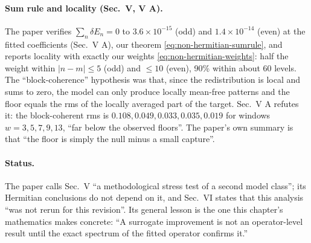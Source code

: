 \paragraph{Sum rule and locality (Sec.~V, V A).} The paper verifies $\sum_n\delta E_n=0$ to $3.6\times10^{-15}$ (odd) and $1.4\times10^{-14}$ (even) at the fitted coefficients (Sec.~V A), our theorem \eqref{eq:non-hermitian-sumrule}, and reports locality with exactly our weights \eqref{eq:non-hermitian-weights}: half the weight within $|n-m|\le5$ (odd) and $\le10$ (even), 90\% within about 60 levels. The ``block-coherence'' hypothesis was that, since the redistribution is local and sums to zero, the model can only produce locally mean-free patterns and the floor equals the rms of the locally averaged part of the target. Sec.~V A refutes it: the block-coherent rms is $0.108,0.049,0.033,0.035,0.019$ for windows $w=3,5,7,9,13$, ``far below the observed floors''. The paper's own summary is that ``the floor is simply the null minus a small capture''.

\paragraph{Status.} The paper calls Sec.~V ``a methodological stress test of a second model class''; its Hermitian conclusions do not depend on it, and Sec.~VI states that this analysis ``was not rerun for this revision''. Its general lesson is the one this chapter's mathematics makes concrete: ``A surrogate improvement is not an operator-level result until the exact spectrum of the fitted operator confirms it.''

